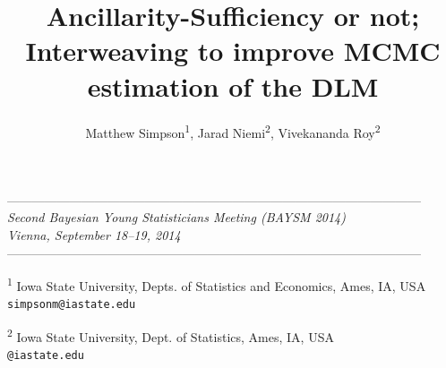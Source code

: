 \documentclass{article}\usepackage[]{graphicx}\usepackage[]{color}
\begin{document}
\title{Ancillarity-Sufficiency or not; Interweaving to improve MCMC estimation of the DLM}

\author{Matthew Simpson\textsuperscript{1}, Jarad Niemi\textsuperscript{2}, Vivekananda Roy\textsuperscript{2}}

\maketitle

\begin{center}
\small{---------------------------------------------------------------------------------------------------
\\
\textit{Second Bayesian Young Statisticians Meeting (BAYSM 2014)\\
Vienna,  September 18--19, 2014}
\\[-.3em]
---------------------------------------------------------------------------------------------------}
\end{center}

\begin{center}
 \vspace{-.5em}
 {\small \textsuperscript{1} Iowa State University, Depts. of Statistics and Economics, Ames, IA, USA\\[-.3em]
 {\tt simpsonm@iastate.edu}}
 
 \vspace{.5em}

{\small \textsuperscript{2} Iowa State University, Dept. of Statistics, Ames, IA, USA\\[-.3em]
{\tt <niemi,vroy>@iastate.edu}}

\end{center}

\vspace*{0.5em}
\end{document}
